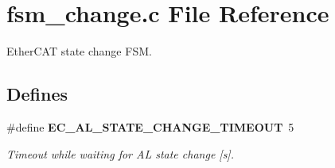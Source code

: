 \section{fsm\-\_\-change.\-c \-File \-Reference}
\label{fsm__change_8c}


\-Ether\-C\-A\-T state change \-F\-S\-M.  


\subsection*{\-Defines}
\begin{DoxyCompactItemize}
\item 
\#define {\bf \-E\-C\-\_\-\-A\-L\-\_\-\-S\-T\-A\-T\-E\-\_\-\-C\-H\-A\-N\-G\-E\-\_\-\-T\-I\-M\-E\-O\-U\-T}~5\label{fsm__change_8c_ac795cfc1b59ef531b45e8d14ecab9841}

\begin{DoxyCompactList}\small\item\em \-Timeout while waiting for \-A\-L state change [s]. \end{DoxyCompactList}\end{DoxyCompactItemize}
